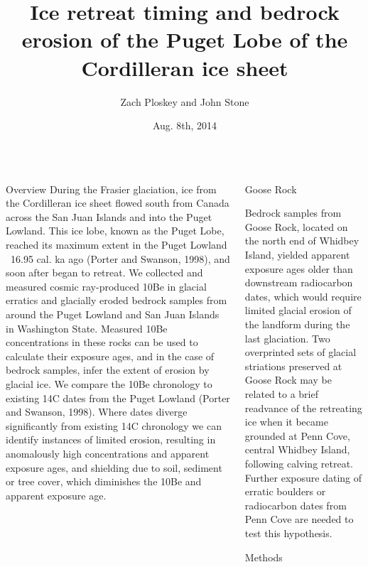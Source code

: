 \documentclass{beamer}
\title{Ice retreat timing and bedrock erosion of the Puget Lobe of the Cordilleran ice sheet}
\author{Zach Ploskey and John Stone}
\institute{Cosmogenic Nuclide Lab, Dept. of Earth and Space Sciences, University of Washington, Seattle}
\date{Aug. 8th, 2014}
\begin{document}
\begin{frame}{}\centering

\begin{columns}[T]

\begin{column}{0.32\columnwidth}

\begin{block}{Overview}	
During the Frasier glaciation, ice from the Cordilleran ice sheet flowed south from Canada across the San Juan Islands and into the Puget Lowland.
This ice lobe, known as the Puget Lobe, reached its maximum extent in the Puget Lowland ~16.95 cal. ka ago  (Porter and Swanson, 1998), and soon after began to retreat.
We collected and measured cosmic ray-produced 10Be in glacial erratics and glacially eroded bedrock samples from around the Puget Lowland and San Juan Islands in Washington State.
Measured 10Be concentrations in these rocks can be used to calculate their exposure ages, and in the case of bedrock samples, infer the extent of erosion by glacial ice.
We compare the 10Be chronology to existing 14C dates from the Puget Lowland (Porter and Swanson, 1998).
Where dates diverge significantly from existing 14C chronology we can identify instances of limited erosion, resulting in anomalously high concentrations and apparent exposure ages, and shielding due to soil, sediment or tree cover, which diminishes the 10Be and apparent exposure age.

\end{block}


\end{column}
	
\begin{column}{.32\columnwidth}
	
\begin{block}{Goose Rock}

Bedrock samples from Goose  Rock, located on the north end of Whidbey Island, yielded apparent exposure ages older than downstream radiocarbon dates, which would require limited glacial erosion of the landform during the last glaciation.
Two overprinted sets of glacial striations preserved at Goose Rock may be related to a brief readvance of the retreating ice when it became grounded at Penn Cove, central Whidbey Island, following calving retreat.
Further exposure dating of erratic boulders or radiocarbon dates from Penn Cove are needed to test this hypothesis. 
	
\end{block}
	
\begin{block}{Methods}


\end{block}
\end{column}
\end{columns}
\end{frame}
\end{document}
